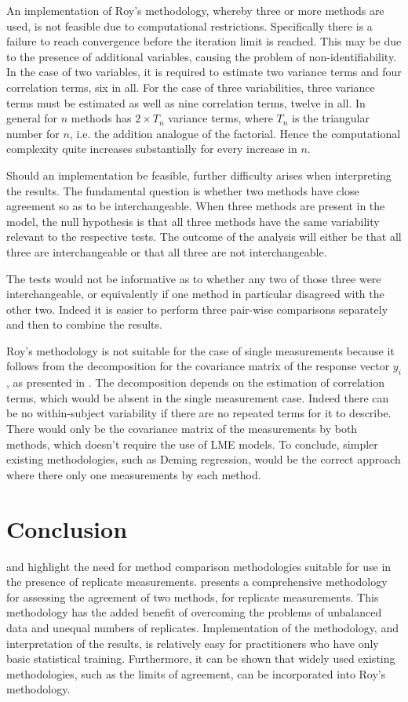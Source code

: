 \documentclass[12pt, a4paper]{report}
\theoremstyle{plain}
\theoremstyle{definition}
\theoremstyle{remark}
\begin{document}
An implementation of Roy's methodology, whereby three or more methods are used, is not feasible due to computational restrictions. Specifically there is a failure to reach convergence before the iteration limit is reached. This may be due to the presence of additional variables, causing the problem of non-identifiability. In the case of two variables, it is required to estimate two variance terms and four correlation terms, six in all. For the case of three variabilities, three variance terms must be estimated as well as nine correlation terms, twelve in all. In general for $n$ methods has $2 \times T_{n}$ variance terms, where $T_n$ is the triangular number for $n$, i.e. the addition analogue of the factorial. Hence the computational complexity quite increases substantially for every increase in $n$.

Should an implementation be feasible, further difficulty arises when interpreting the results. The fundamental question is whether two methods have close agreement so as to be interchangeable. When three methods are present in the model, the null hypothesis is that all three methods have the same variability relevant to the respective tests. The outcome of the analysis will either be that all three are interchangeable or that all three are not interchangeable.

The tests would not be informative as to whether any two of those three were interchangeable, or equivalently if one method in particular disagreed with the other two. Indeed it is easier to perform three pair-wise comparisons separately and then to combine the results.

Roy's methodology is not suitable for the case of single measurements because it follows from the decomposition for the covariance matrix of the response vector $y_{i}$, as presented in \citet{hamlett}. The decomposition depends on the estimation of correlation terms, which would be absent in the single measurement case. Indeed there can be no within-subject variability if there are no repeated terms for it to describe. There would only be the covariance matrix of the measurements by both methods, which doesn't require the use of LME models. To conclude, simpler existing methodologies, such as Deming regression, would be the correct approach where there only one measurements by each method.

\section{Conclusion}
\citet{BXC2008} and \citet{roy} highlight the need for method comparison methodologies suitable for use in the presence of replicate measurements. \citet{roy} presents a comprehensive methodology for assessing the agreement of two methods, for replicate measurements. This methodology has the added benefit of overcoming the problems of unbalanced data and unequal numbers of replicates. Implementation of the methodology, and interpretation of the results, is relatively easy for practitioners who have only basic statistical training. Furthermore, it can be shown that widely used existing methodologies, such as the limits of agreement, can be incorporated into Roy's methodology.


\end{document}
